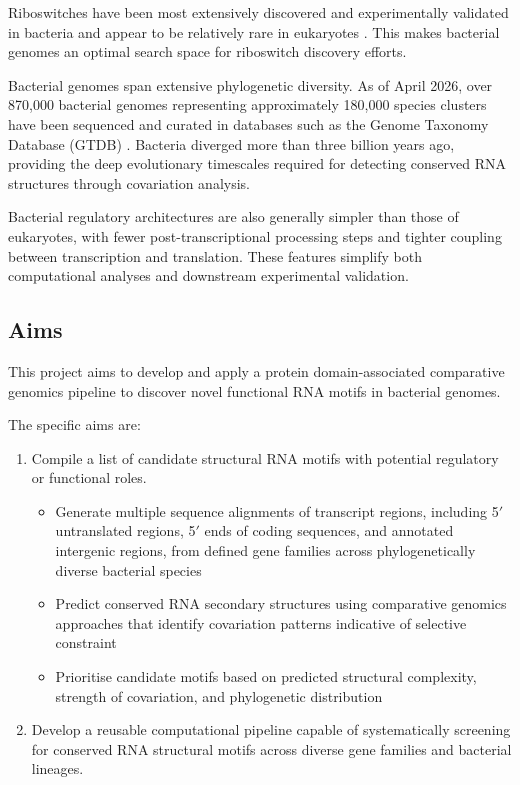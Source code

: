 \documentclass{article}
\begin{document}
Riboswitches have been most extensively discovered and experimentally validated in bacteria and appear to be relatively rare in eukaryotes \parencite{Kavita2023}.
This makes bacterial genomes an optimal search space for riboswitch discovery efforts.

Bacterial genomes span extensive phylogenetic diversity.
As of April 2026, over 870,000 bacterial genomes representing approximately 180,000 species clusters have been sequenced and curated in databases such as the Genome Taxonomy Database (GTDB) \parencite{GTDB2026}.
Bacteria diverged more than three billion years ago, providing the deep evolutionary timescales required for detecting conserved RNA structures through covariation analysis.

Bacterial regulatory architectures are also generally simpler than those of eukaryotes, with fewer post-transcriptional processing steps and tighter coupling between transcription and translation.
These features simplify both computational analyses and downstream experimental validation.

\subsection{Aims}

This project aims to develop and apply a protein domain-associated comparative genomics pipeline to discover novel functional RNA motifs in bacterial genomes.

The specific aims are:

\begin{enumerate}
    \item Compile a list of candidate structural RNA motifs with potential regulatory or functional roles.
    \begin{itemize}
        \item Generate multiple sequence alignments of transcript regions, including 5$'$ untranslated regions, 5$'$ ends of coding sequences, and annotated intergenic regions, from defined gene families across phylogenetically diverse bacterial species
        \item Predict conserved RNA secondary structures using comparative genomics approaches that identify covariation patterns indicative of selective constraint
        \item Prioritise candidate motifs based on predicted structural complexity, strength of covariation, and phylogenetic distribution
    \end{itemize}

    \item Develop a reusable computational pipeline capable of systematically screening for conserved RNA structural motifs across diverse gene families and bacterial lineages.
\end{enumerate}
\end{document}
